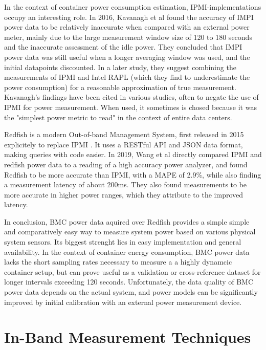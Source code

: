 In the context of container power consumption estimation, IPMI-implementations occupy an interesting role. In 2016, Kavanagh et al\parencite{kavanagh2016accuracy} found the accuracy of IMPI power data to be relatively inaccurate when compared with an external power meter, mainly due to the large measurement window size of 120 to 180 seconds and the inaccurate assessment of the idle power. They concluded that IMPI power data was still useful when a longer averaging window was used, and the initial datapoints discounted. In a later study, they suggest combining the measurements of IPMI and Intel RAPL (which they find to underestimate the power consumption) for a reasonable approximation of true measurement\parencite{kavanagh2019rapid}. Kavanagh's findings have been cited in various studies, often to negate the use of IPMI for power measurement. When used, it sometimes is chosed because it was the "simplest power metric to read"\parencite{white2020monitoring} in the context of entire data centers.

Redfish is a modern Out-of-band Management System, first released in 2015 explicitely to replace IPMI \parencite{thomas-krenn-redfish}. It uses a RESTful API and JSON data format, making queries with code easier. In 2019, Wang et al\parencite{wang2019empirical} directly compared IPMI and redfish power data to a reading of a high accuracy power analyzer, and found Redfish to be more accurate than IPMI, with a MAPE of 2.9\%, while also finding a measurement latency of about 200ms. They also found measurements to be more accurate in higher power ranges, which they attribute to the improved latency.

In conclusion, BMC power data aquired over Redfish provides a simple simple and comparatively easy way to measure system power based on various physical system sensors. Its biggest strenght lies in easy implementation and general availability. In the context of container energy consumption, BMC power data lacks the short sampling rates necessary to measure a a highly dynamcic container setup, but can prove useful as a validation or cross-reference dataset for longer intervals exceeding 120 seconds. Unfortunately, the data quality of BMC power data depends on the actual system, and power models can be significantly improved by initial calibration with an external power measurement device\parencite{kavanagh2016accuracy}.

\section{In-Band Measurement Techniques}

